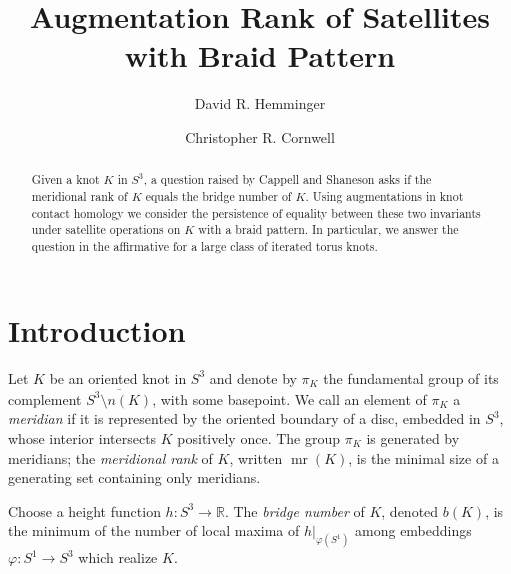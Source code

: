 \documentclass[11pt]{amsart}
\makeatletter
\def\R{{\mathbb R}}
\def\mr{\operatorname{mr}}
\theoremstyle{definition}
\def\listtodoname{List of Todos}
\def\listoftodos{\@starttoc{tdo}\listtodoname}
\makeatother
\begin{document}





\title{Augmentation Rank of Satellites with Braid Pattern}

\author{David R. Hemminger}
\author{Christopher R. Cornwell}

\begin{abstract}
Given a knot $K$ in $S^3$, a question raised by Cappell and Shaneson asks if the meridional rank of $K$ equals the bridge number of $K$. Using augmentations in knot contact homology we consider the persistence of equality between these two invariants under satellite operations on $K$ with a braid pattern. In particular, we answer the question in the affirmative for a large class of iterated torus knots.
\end{abstract}

\maketitle

\section{Introduction}
Let $K$ be an oriented knot in $S^3$ and denote by $\pi_K$ the fundamental group of its complement $\overline{S^3\setminus n(K)}$, with some basepoint. We call an element of $\pi_K$ a \emph{meridian} if it is represented by the oriented boundary of a disc, embedded in $S^3$, whose interior intersects $K$ positively once. The group $\pi_K$ is generated by meridians; the \emph{meridional rank} of $K$, written $\mr(K)$, is the minimal size of a generating set containing only meridians. 

Choose a height function $h:S^3\to\R$. The \emph{bridge number} of $K$, denoted $b(K)$, is the minimum of the number of local maxima of $h|_{\varphi(S^1)}$ among embeddings $\varphi:S^1\to S^3$ which realize $K$.
\end{document}
